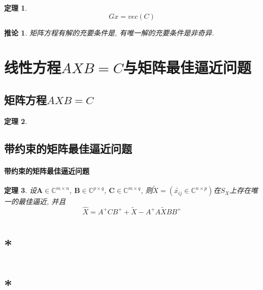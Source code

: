 \documentclass[twoside]{article}
\newtheorem{theorem}{定理}[section]
\newtheorem{corollary}{推论}[section]
\begin{document}
\begin{theorem}
  \begin{equation}
    Gx=vec(C)
  \end{equation}
\end{theorem}

\begin{corollary}
  矩阵方程有解的充要条件是, 有唯一解的充要条件是非奇异.
\end{corollary}

\section{线性方程$AXB=C$与矩阵最佳逼近问题}
\subsection{矩阵方程$AXB=C$}
\begin{theorem}
\end{theorem}
\subsection{带约束的矩阵最佳逼近问题}
\paragraph{带约束的矩阵最佳逼近问题}
\begin{theorem}
  设$\mathbf{A}\in \mathbb{C}^{m\times n}$, $\mathbf{B}\in \mathbb{C}^{p\times q}$, $\mathbf{C}\in \mathbb{C}^{m\times q}$, 则$\tilde{X}=(\tilde{x_{ij}} \in \mathbb{C}^{n\times p})$在$S_X$上存在唯一的最佳逼近, 并且
  \begin{equation}
    \hat{X} = A^+CB^+ + \tilde{X} - A^+A\tilde{X}BB^+
  \end{equation}
\end{theorem}

\section{*}

\section{*}
\end{document}

